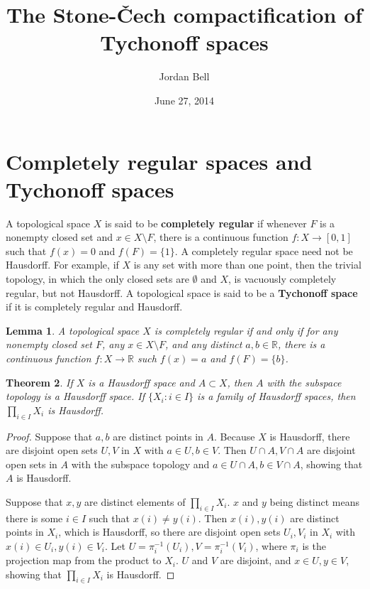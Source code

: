 \documentclass{article}
\newtheorem{theorem}{Theorem}
\newtheorem{lemma}[theorem]{Lemma}
\theoremstyle{definition}
\begin{document}
\title{The Stone-\v{C}ech compactification of Tychonoff spaces}
\author{Jordan Bell}
\date{June 27, 2014}

\maketitle

\section{Completely regular spaces and Tychonoff spaces}
\label{introduction}
A topological space $X$ is said to be \textbf{completely regular} if whenever
$F$ is a nonempty closed set and $x \in X \setminus F$,
there is a continuous function $f:X \to [0,1]$ such that $f(x)=0$ and $f(F) = \{1\}$. 
A completely regular space need not be Hausdorff. For example, if $X$ is any set with more than one point,
then the trivial topology, in which the only closed sets are $\emptyset$ and $X$, is vacuously completely regular, but not Hausdorff.
A topological space is said to be a \textbf{Tychonoff space} if it is completely regular and Hausdorff. 

\begin{lemma}
A topological space $X$ is completely regular if and only if for any 
nonempty closed set $F$, any $x \in X \setminus F$, and
any
distinct $a,b \in \mathbb{R}$, there is a continuous
function $f:X \to \mathbb{R}$ such $f(x)=a$ and $f(F)=\{b\}$.
\label{equivalentcr}
\end{lemma}


\begin{theorem}
If $X$ is a Hausdorff space and $A \subset X$, then $A$ with the subspace topology is a Hausdorff space. If $\{X_i:i \in I\}$
is a family of Hausdorff spaces, then $\prod_{i \in I} X_i$ is Hausdorff.
\end{theorem}
\begin{proof}
Suppose that $a,b$ are distinct points in $A$. Because $X$ is Hausdorff, there are disjoint open sets $U,V$ in $X$ with $a \in U, b \in V$. 
Then $U \cap A, V \cap A$ are disjoint open sets in $A$ with the subspace topology  and $a \in U \cap A, b \in V \cap A$, showing that $A$ is Hausdorff.

Suppose that $x,y$ are distinct elements of $\prod_{i \in I} X_i$. $x$ and $y$ being distinct means there is some $i \in I$ such that
$x(i) \neq y(i)$. Then $x(i), y(i)$ are distinct points in $X_i$, which is Hausdorff, so there are disjoint open sets $U_i, V_i$ in $X_i$
with $x(i) \in U_i, y(i) \in V_i$. Let $U=\pi_i^{-1}(U_i), V=\pi_i^{-1}(V_i)$, where $\pi_i$ is the projection map
from the product to $X_i$. $U$ and $V$ are disjoint, and $x \in U, y \in V$, showing that $\prod_{i \in I} X_i$ is Hausdorff.
\end{proof}
\end{document}
